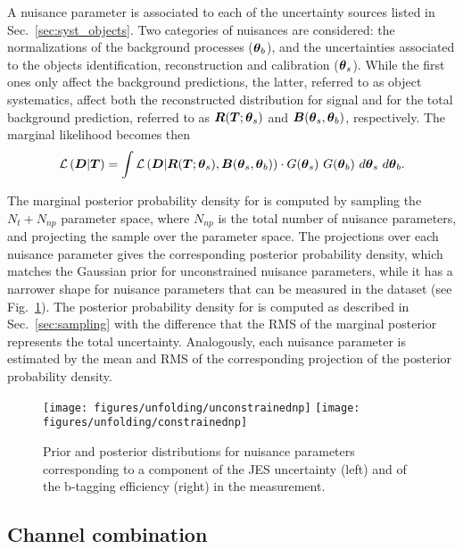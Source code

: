 A nuisance parameter is associated to each of the uncertainty sources
listed in Sec.~\ref{sec:syst_objects}. Two categories of nuisances
are considered: the normalizations of the background processes
($\boldsymbol{\theta}{}_b$), and the uncertainties associated to the objects
identification, reconstruction and calibration ($\boldsymbol{\theta}{}_s$).
While the first ones only affect the background predictions, the
latter, referred to as object systematics, affect both the
reconstructed distribution for \ttbar{} signal and for
the total background prediction, referred to as
$\boldsymbol{R}{}(\boldsymbol{T}{};\boldsymbol{\theta}{}_s)$ and
$\boldsymbol{B}{}(\boldsymbol{\theta}{}_s,\boldsymbol{\theta}{}_b)$, respectively.
The marginal likelihood becomes then
\begin{equation}
\label{eq:marginalLhood}
  \mathcal{L}\left(\boldsymbol{D}{}|\boldsymbol{T}{}\right)=
  \int
  \mathcal{L}\left(\boldsymbol{D}{}|\boldsymbol{R}{}(\boldsymbol{T}{};\boldsymbol{\theta}{}_s),\boldsymbol{B}{}(\boldsymbol{\theta}{}_s,\boldsymbol{\theta}{}_b)\right) 
  \cdot{} G(\boldsymbol{\theta}{}_s) ~G(\boldsymbol{\theta}{}_b)
  ~d\boldsymbol{\theta}{}_s ~d\boldsymbol{\theta}{}_b.
\end{equation}

The marginal posterior probability density for \Truth{} is computed by
sampling the $N_t+N_{np}$ parameter space, where $N_{np}$ is the
total number of nuisance parameters, and projecting the sample over
the \Truth{} parameter space. The projections over each nuisance
parameter gives the corresponding posterior probability density,
which matches the Gaussian prior for unconstrained nuisance
parameters, while it has a narrower shape for nuisance parameters
that can be measured in the dataset (see Fig.~\ref{fig:nuispar}).
The posterior probability density for \ac{} is computed as described in
Sec.~\ref{sec:sampling} with the difference that the RMS of the
marginal posterior represents the total uncertainty. Analogously, each
nuisance parameter is estimated by the mean and RMS of the
corresponding projection of the posterior probability density.

\begin{figure}[!htb]\centering
  \texttt{[image: figures/unfolding/unconstrainednp]}
  \texttt{[image: figures/unfolding/constrainednp]}
  \caption{Prior and posterior distributions for nuisance parameters
    corresponding to a component of the JES uncertainty (left) and of
    the b-tagging efficiency (right) in the \eighttev{} measurement.}
  \label{fig:nuispar}
\end{figure}

\subsection{Channel combination}

